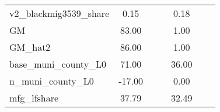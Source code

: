 \begin{table}[htbp]
\begin{tabular}{l*{2}{ccc}}
v2\_blackmig3539\_share&        0.15&            &            &        0.18&            &            \\
GM                  &       83.00&            &            &        1.00&            &            \\
GM\_hat2             &       86.00&            &            &        1.00&            &            \\
base\_muni\_county\_L0 &       71.00&            &            &       36.00&            &            \\
n\_muni\_county\_L0    &      -17.00&            &            &        0.00&            &            \\
mfg\_lfshare         &       37.79&            &            &       32.49&            &            \\
\bottomrule
\end{tabular}
\end{table}
